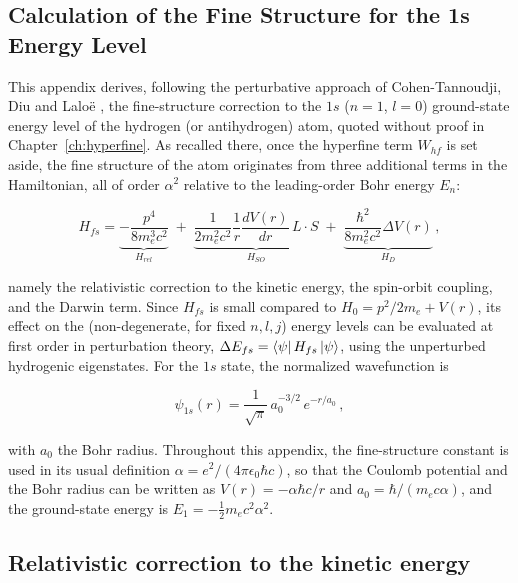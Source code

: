 \begin{appendices}

\section{Calculation of the Fine Structure for the 1s Energy Level} \label{app:finestructure}

This appendix derives, following the perturbative approach of Cohen-Tannoudji, Diu and Lalo\"e \cite{QuantumMechanics}, the fine-structure correction to the $1s$ ($n=1$, $l=0$) ground-state energy level of the hydrogen (or antihydrogen) atom, quoted without proof in Chapter~\ref{ch:hyperfine}. As recalled there, once the hyperfine term $W_{hf}$ is set aside, the fine structure of the atom originates from three additional terms in the Hamiltonian, all of order $\alpha^2$ relative to the leading-order Bohr energy $E_n$:

\begin{equation}
H_{fs} = \underbrace{-\dfrac{p^4}{8 m_{e}^3 c^2}}_{H_{rel}} \; + \; \underbrace{\frac{1}{2m_{e}^2 c^2} \dfrac{1}{r}\dfrac{dV(r)}{dr}\, L \cdot S}_{H_{SO}} \; + \; \underbrace{\frac{\hbar^2}{8m_{e}^2 c^2} \Delta V(r)}_{H_{D}} \, ,
\end{equation}

namely the relativistic correction to the kinetic energy, the spin-orbit coupling, and the Darwin term. Since $H_{fs}$ is small compared to $H_0 = p^2/2m_e + V(r)$, its effect on the (non-degenerate, for fixed $n,l,j$) energy levels can be evaluated at first order in perturbation theory, $\Delta E_{fs} = \bra{\psi} H_{fs} \ket{\psi}$, using the unperturbed hydrogenic eigenstates. For the $1s$ state, the normalized wavefunction is

\begin{equation}
\psi_{1s}(r) = \frac{1}{\sqrt{\pi}}\, a_0^{-3/2}\, e^{-r/a_0} \, ,
\end{equation}

with $a_0$ the Bohr radius. Throughout this appendix, the fine-structure constant is used in its usual definition $\alpha = e^2/(4\pi \epsilon_0 \hbar c)$, so that the Coulomb potential and the Bohr radius can be written as $V(r) = -\alpha \hbar c / r$ and $a_0 = \hbar/(m_e c \alpha)$, and the ground-state energy is $E_1 = -\frac{1}{2} m_e c^2 \alpha^2$.

\subsection*{Relativistic correction to the kinetic energy}


\end{appendices}
